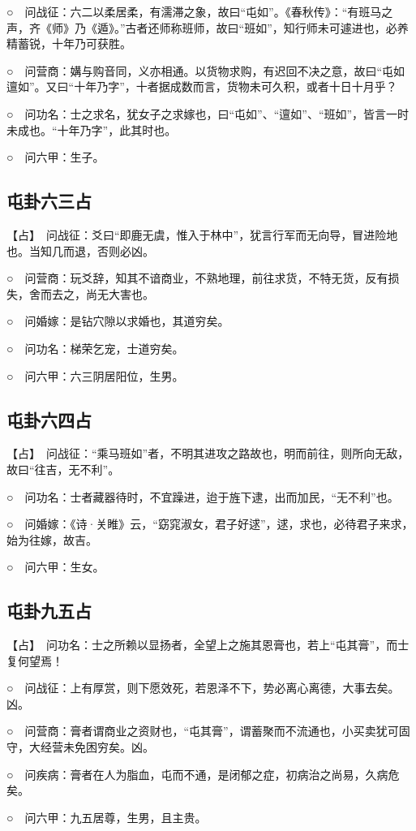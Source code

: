\documentclass[12pt,oneside]{book}
\begin{document}
○　问战征：六二以柔居柔，有濡滞之象，故曰“屯如”。《春秋传》：“有班马之声，齐《师》乃《遁》。”古者还师称班师，故曰“班如”，知行师未可遽进也，必养精蓄锐，十年乃可获胜。

○　问营商：媾与购音同，义亦相通。以货物求购，有迟回不决之意，故曰“屯如邅如”。又曰“十年乃字”，十者据成数而言，货物未可久积，或者十日十月乎？

○　问功名：士之求名，犹女子之求嫁也，曰“屯如”、“邅如”、“班如”，皆言一时未成也。“十年乃字”，此其时也。

○　问六甲：生子。

\subsection{屯卦六三占}
【占】　问战征：爻曰“即鹿无虞，惟入于林中”，犹言行军而无向导，冒进险地也。当知几而退，否则必凶。

○　问营商：玩爻辞，知其不谙商业，不熟地理，前往求货，不特无货，反有损失，舍而去之，尚无大害也。

○　问婚嫁：是钻穴隙以求婚也，其道穷矣。

○　问功名：梯荣乞宠，士道穷矣。

○　问六甲：六三阴居阳位，生男。

\subsection{屯卦六四占}
【占】　问战征：“乘马班如”者，不明其进攻之路故也，明而前往，则所向无敌，故曰“往吉，无不利”。

○　问功名：士者藏器待时，不宜躁进，迨于旌下逮，出而加民，“无不利”也。

○　问婚嫁：《诗·关睢》云，“窈窕淑女，君子好逑”，逑，求也，必待君子来求，始为往嫁，故吉。

○　问六甲：生女。

\subsection{屯卦九五占}
【占】　问功名：士之所赖以显扬者，全望上之施其恩膏也，若上“屯其膏”，而士复何望焉！

○　问战征：上有厚赏，则下愿效死，若恩泽不下，势必离心离德，大事去矣。凶。

○　问营商：膏者谓商业之资财也，“屯其膏”，谓蓄聚而不流通也，小买卖犹可固守，大经营未免困穷矣。凶。

○　问疾病：膏者在人为脂血，屯而不通，是闭郁之症，初病治之尚易，久病危矣。

○　问六甲：九五居尊，生男，且主贵。
\end{document}
